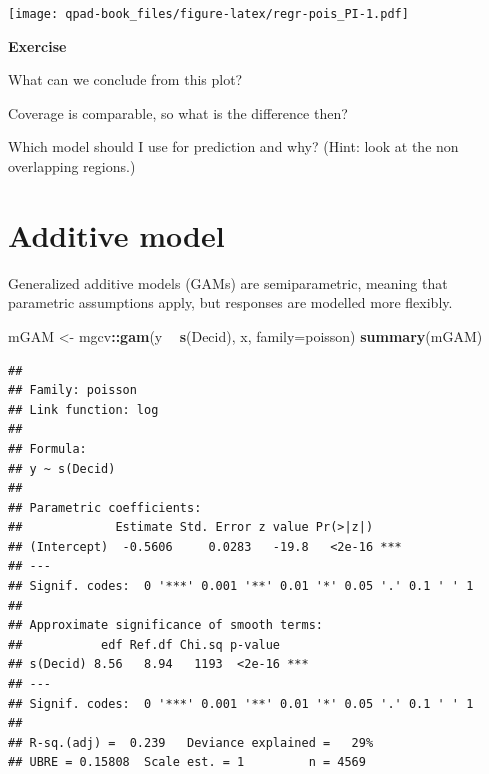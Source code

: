 \documentclass[12pt,]{book}
\newenvironment{Shaded}{\begin{snugshade}}{\end{snugshade}}
\newcommand{\DataTypeTok}[1]{\textcolor[rgb]{0.13,0.29,0.53}{#1}}
\newcommand{\DecValTok}[1]{\textcolor[rgb]{0.00,0.00,0.81}{#1}}
\newcommand{\KeywordTok}[1]{\textcolor[rgb]{0.13,0.29,0.53}{\textbf{#1}}}
\newcommand{\NormalTok}[1]{#1}
\newcommand{\OperatorTok}[1]{\textcolor[rgb]{0.81,0.36,0.00}{\textbf{#1}}}
\newcommand{\OtherTok}[1]{\textcolor[rgb]{0.56,0.35,0.01}{#1}}
\newcommand{\StringTok}[1]{\textcolor[rgb]{0.31,0.60,0.02}{#1}}
\let\BeginKnitrBlock\begin \let\EndKnitrBlock\end
\begin{document}
\begin{Shaded}
\end{Shaded}

\texttt{[image: qpad-book\_files/figure-latex/regr-pois\_PI-1.pdf]}

\BeginKnitrBlock{rmdexercise}
\textbf{Exercise}

What can we conclude from this plot?

Coverage is comparable, so what is the difference then?

Which model should I use for prediction and why? (Hint: look at the non overlapping regions.)
\EndKnitrBlock{rmdexercise}

\hypertarget{additive-model}{%
\section{Additive model}\label{additive-model}}

Generalized additive models (GAMs) are semiparametric, meaning that
parametric assumptions apply, but responses are modelled more flexibly.

\begin{Shaded}
\begin{Highlighting}[]
\NormalTok{mGAM <-}\StringTok{ }\NormalTok{mgcv}\OperatorTok{::}\KeywordTok{gam}\NormalTok{(y }\OperatorTok{~}\StringTok{ }\KeywordTok{s}\NormalTok{(Decid), x, }\DataTypeTok{family=}\NormalTok{poisson)}
\KeywordTok{summary}\NormalTok{(mGAM)}
\end{Highlighting}
\end{Shaded}

\begin{verbatim}
## 
## Family: poisson 
## Link function: log 
## 
## Formula:
## y ~ s(Decid)
## 
## Parametric coefficients:
##             Estimate Std. Error z value Pr(>|z|)    
## (Intercept)  -0.5606     0.0283   -19.8   <2e-16 ***
## ---
## Signif. codes:  0 '***' 0.001 '**' 0.01 '*' 0.05 '.' 0.1 ' ' 1
## 
## Approximate significance of smooth terms:
##           edf Ref.df Chi.sq p-value    
## s(Decid) 8.56   8.94   1193  <2e-16 ***
## ---
## Signif. codes:  0 '***' 0.001 '**' 0.01 '*' 0.05 '.' 0.1 ' ' 1
## 
## R-sq.(adj) =  0.239   Deviance explained =   29%
## UBRE = 0.15808  Scale est. = 1         n = 4569
\end{verbatim}
\end{document}
